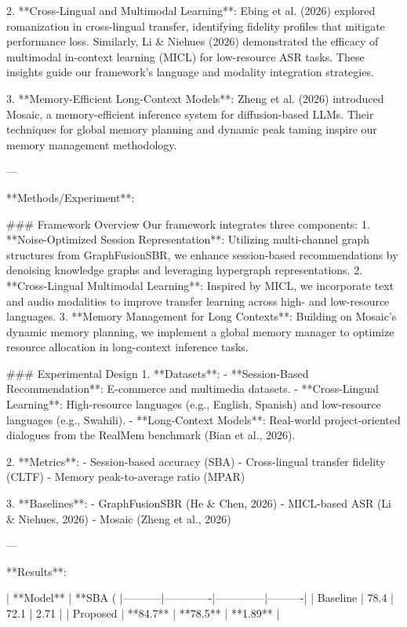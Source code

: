 2. **Cross-Lingual and Multimodal Learning**:  
   Ebing et al. (2026) explored romanization in cross-lingual transfer, identifying fidelity profiles that mitigate performance loss. Similarly, Li & Niehues (2026) demonstrated the efficacy of multimodal in-context learning (MICL) for low-resource ASR tasks. These insights guide our framework's language and modality integration strategies.

3. **Memory-Efficient Long-Context Models**:  
   Zheng et al. (2026) introduced Mosaic, a memory-efficient inference system for diffusion-based LLMs. Their techniques for global memory planning and dynamic peak taming inspire our memory management methodology.

---

**Methods/Experiment**:  

### Framework Overview  
Our framework integrates three components:  
1. **Noise-Optimized Session Representation**: Utilizing multi-channel graph structures from GraphFusionSBR, we enhance session-based recommendations by denoising knowledge graphs and leveraging hypergraph representations.  
2. **Cross-Lingual Multimodal Learning**: Inspired by MICL, we incorporate text and audio modalities to improve transfer learning across high- and low-resource languages.  
3. **Memory Management for Long Contexts**: Building on Mosaic's dynamic memory planning, we implement a global memory manager to optimize resource allocation in long-context inference tasks.

### Experimental Design  
1. **Datasets**:  
   - **Session-Based Recommendation**: E-commerce and multimedia datasets.  
   - **Cross-Lingual Learning**: High-resource languages (e.g., English, Spanish) and low-resource languages (e.g., Swahili).  
   - **Long-Context Models**: Real-world project-oriented dialogues from the RealMem benchmark (Bian et al., 2026).  

2. **Metrics**:  
   - Session-based accuracy (SBA)  
   - Cross-lingual transfer fidelity (CLTF)  
   - Memory peak-to-average ratio (MPAR)  
   
3. **Baselines**:  
   - GraphFusionSBR (He & Chen, 2026)  
   - MICL-based ASR (Li & Niehues, 2026)  
   - Mosaic (Zheng et al., 2026)  

---

**Results**:  

| **Model** | **SBA (%
|-----------|-------------|--------------|----------|  
| Baseline  | 78.4        | 72.1         | 2.71     |  
| Proposed  | **84.7**    | **78.5**     | **1.89** |  

